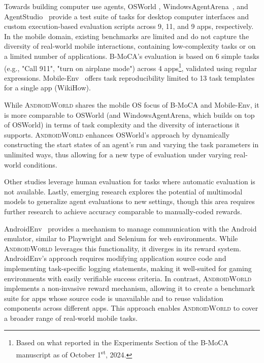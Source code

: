 \documentclass{article}
\newcommand{\system}{\textsc{AndroidWorld}\xspace}
\begin{document}
Towards building computer use agents, OSWorld \citep{xie2024osworld}, WindowsAgentArena~\citep{bonatti2024windowsagentarenaevaluating}, and AgentStudio~\citep{zheng2024agentstudiotoolkitbuildinggeneral} provide a test suite of tasks for desktop computer interfaces and custom execution-based evaluation scripts across 9, 11, and 9 apps, respectively. In the mobile domain, existing benchmarks are limited and do not capture the diversity of real-world mobile interactions, containing low-complexity tasks or on a limited number of applications. B-MoCA's \citep{lee2024benchmarking} evaluation is based on 6 simple tasks (e.g., "Call 911", "turn on airplane mode") across 4 apps\footnote{Based on what reported in the Experiments Section of the B-MoCA manuscript as of October 1\textsuperscript{st}, 2024.}, validated using regular expressions. Mobile-Env~\citep{mobile-env} offers task reproducibility limited to 13 task templates for a single app (WikiHow).

While \system shares the mobile OS focus of B-MoCA and Mobile-Env, it is more comparable to OSWorld (and WindowsAgentArena, which builds on top of OSWorld) in terms of task complexity and the diversity of interactions it supports. \system enhances OSWorld's approach by dynamically constructing the start states of an agent's run and varying the task parameters in unlimited ways, thus allowing for a new type of evaluation under varying real-world conditions.

Other studies leverage human evaluation \citep{rawles2023android, zheng2023seeact,bishop2024latent} for tasks where automatic evaluation is not available.  Lastly, emerging research \citep{Pan2024-kc, he2024webvoyager, android-arena, zheng2024agentstudiotoolkitbuildinggeneral} explores the potential of multimodal models to generalize agent evaluations to new settings, though this area requires further research to achieve accuracy comparable to manually-coded rewards.

AndroidEnv~\citep{android_env} provides a mechanism to manage communication with the Android emulator, similar to Playwright and Selenium for web environments. While \system leverages this functionality, it diverges in its reward system. AndroidEnv's approach requires modifying application source code and implementing task-specific logging statements, making it well-suited for gaming environments with easily verifiable success criteria. In contrast, \system implements a non-invasive reward mechanism, allowing it to create a benchmark suite for apps whose source code is unavailable and to reuse validation components across different apps. This approach enables \system to cover a broader range of real-world mobile tasks.
\end{document}

